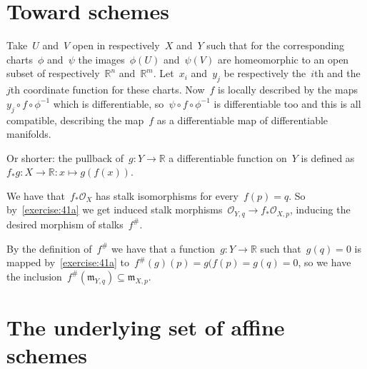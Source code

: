 \section{Toward schemes}

\begin{exercise} 
  \label{exercise:41a}
  Take~$U$ and~$V$ open in respectively~$X$ and~$Y$ such that for the corresponding charts~$\phi$ and~$\psi$ the images~$\phi(U)$ and~$\psi(V)$ are homeomorphic to an open subset of respectively~$\mathbb{R}^n$ and~$\mathbb{R}^m$. Let~$x_i$ and~$y_j$ be respectively the~$i$th and the~$j$th coordinate function for these charts. Now~$f$ is locally described by the maps~$y_j\circ f\circ\phi^{-1}$ which is differentiable, so~$\psi\circ f\circ\phi^{-1}$ is differentiable too and this is all compatible, describing the map~$f$ as a differentiable map of differentiable manifolds.

  Or shorter: the pullback of~$g\colon Y\to\mathbb{R}$ a differentiable function on~$Y$ is defined as~$f_*g\colon X\to\mathbb{R}:x\mapsto g(f(x))$.
\end{exercise}

\begin{exercise}
  We have that~$f_*\mathcal{O}_X$ has stalk isomorphisms for every~$f(p)=q$. So by~\autoref{exercise:41a} we get induced stalk morphisms~$\mathcal{O}_{Y,q}\to f_*\mathcal{O}_{X,p}$, inducing the desired morphism of stalks~$f^{\#}$.

  By the definition of~$f^{\#}$ we have that a function~$g\colon Y\to\mathbb{R}$ such that~$g(q)=0$ is mapped by~\autoref{exercise:41a} to~$f^{\#}(g)(p)=g(f(p)=g(q)=0$, so we have the inclusion~$f^{\#}(\mathfrak{m}_{Y,q})\subseteq\mathfrak{m}_{X,p}$.
\end{exercise}


\section{The underlying set of affine schemes}

